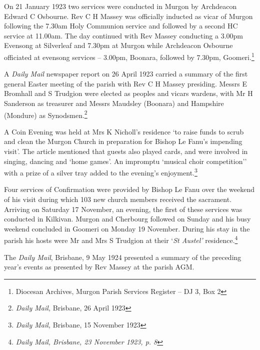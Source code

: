 On 21 January 1923 two services were conducted in Murgon by Archdeacon
Edward C Osbourne. Rev C H Massey was officially inducted as vicar of
Murgon following the 7.30am Holy Communion service and followed by a
second HC service at 11.00am. The day continued with Rev Massey
conducting a 3.00pm Evensong at Silverleaf and 7.30pm at Murgon while
Archdeacon Osbourne officiated at evensong services -- 3.00pm, Boonara,
followed by 7.30pm, Goomeri.\footnote{Diocesan Archives, Murgon Parish
  Services Register -- DJ 3, Box 2}

A \emph{Daily Mail} newspaper report on 26 April 1923 carried a summary
of the first general Easter meeting of the parish with Rev C H Massey
presiding. Messrs E Bromhall and S Trudgion were elected as peoples and
vicars wardens, with Mr H Sanderson as treasurer and Messrs Maudsley
(Boonara) and Hampshire (Mondure) as Synodsmen.\footnote{\emph{Daily
  Mail,} Brisbane, 26 April 1923}

A Coin Evening was held at Mrs K Nicholl's residence `to raise funds to
scrub and clean the Murgon Church in preparation for Bishop Le Fanu's
impending visit'. The article mentioned that guests also played cards,
and were involved in singing, dancing and `home games'. An impromptu
`musical choir competition'' with a prize of a silver tray added to the
evening's enjoyment.\footnote{\emph{Daily Mail,} Brisbane, 15 November
  1923}

Four services of Confirmation were provided by Bishop Le Fanu over the
weekend of his visit during which 103 new church members received the
sacrament. Arriving on Saturday 17 November, an evening, the first of
these services was conducted in Kilkivan. Murgon and Cherbourg followed
on Sunday and his busy weekend concluded in Goomeri on Monday 19
November. During his stay in the parish his hosts were Mr and Mrs S
Trudgion at their `\emph{St Austel'} residence.\footnote{\emph{Daily
  Mail, Brisbane, 23 November 1923, p. 8}}

The \emph{Daily Mail}, Brisbane, 9 May 1924 presented a summary of the
preceding year's events as presented by Rev Massey at the parish AGM.

